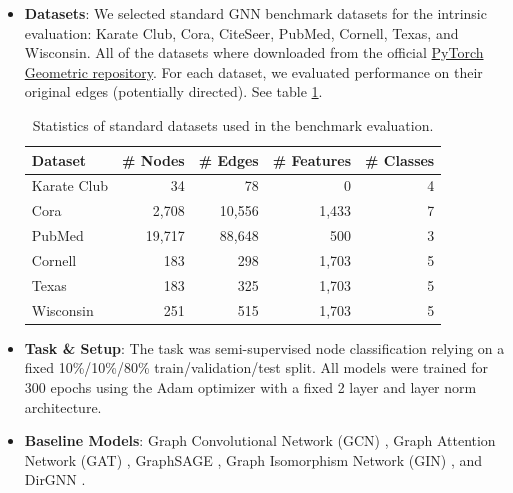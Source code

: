 \documentclass[utf8]{FrontiersinHarvard}
\begin{document}
	\begin{itemize}
		\item \textbf{Datasets}: We selected standard GNN benchmark datasets for the intrinsic evaluation: Karate Club, Cora, CiteSeer, PubMed, Cornell, Texas, and Wisconsin. All of the datasets where downloaded from the official \href{https://pytorch-geometric.readthedocs.io/en/2.6.0/modules/datasets.html}{PyTorch Geometric repository}. For each dataset, we evaluated performance on their original edges (potentially directed). See table \ref{tab:dataset_stats}.
		
		\begin{table}[h!]
			\centering
			\caption{Statistics of standard datasets used in the benchmark evaluation.}
			\label{tab:dataset_stats}
			\begin{tabular}{lrrrr}
				\toprule
				\textbf{Dataset} & \textbf{\# Nodes} & \textbf{\# Edges} & \textbf{\# Features} & \textbf{\# Classes} \\ \midrule
				Karate Club      & 34             	 & 78            	 & 0                
				& 4 				  \\
				Cora             & 2,708             & 10,556            & 1,433                & 7                   \\
				PubMed           & 19,717            & 88,648            & 500                  & 3                   \\
				Cornell          & 183               & 298               & 1,703                & 5                   \\
				Texas            & 183               & 325               & 1,703                & 5                   \\
				Wisconsin        & 251               & 515               & 1,703                & 5                   \\ \bottomrule
			\end{tabular}
		\end{table}
		
		\item \textbf{Task \& Setup}: The task was semi-supervised node classification relying on a fixed 10\%/10\%/80\% train/validation/test split. All models were trained for 300 epochs using the Adam optimizer with a fixed 2 layer and layer norm architecture.
		
		\item \textbf{Baseline Models}: Graph Convolutional Network (GCN) \cite{kipf_semisupervisedclassificationgraph_2017}, Graph Attention Network (GAT) \cite{velickovic_graphattentionnetworks_2018}, GraphSAGE \cite{hamilton_inductiverepresentationlearning_2018}, Graph Isomorphism Network (GIN) \cite{xu_howpowerfulare_2019}, and DirGNN \cite{rossi_edgedirectionalityimproves_2023}.
		

\end{itemize}
\end{document}
